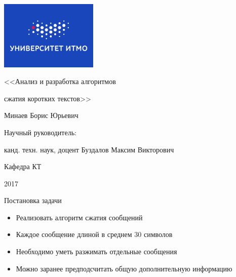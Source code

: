 \documentclass[t,13pt,graphics=pdflatex,xcolor=table,aspectratio=43]{beamer}
\begin{document}
\begingroup
{}
\begin{frame}[plain]
\color{white}
\centering\bfseries
\includegraphics[width=0.35\textwidth]{itmo_small_blue_rus.png}

{\Large {<<}Анализ и разработка алгоритмов \par
            сжатия коротких текстов{>>} \par}

\vspace{0pt plus 0.3filll}

{\large Минаев Борис Юрьевич}

\vspace{0pt plus 0.3filll}

{\small Научный руководитель:\par
 канд. техн. наук, доцент Буздалов Максим Викторович}

\vspace{0pt plus 0.3filll}

{\small Кафедра КТ\par 2017} 

\vspace{0pt plus 1filll}
\end{frame}
\endgroup




\begin{frame}{Постановка задачи}
\begin{itemize}
    \item Реализовать алгоритм сжатия сообщений
    \item Каждое сообщение длиной в среднем 30 символов
    \item Необходимо уметь разжимать отдельные сообщения
    \item Можно заранее предподсчитать общую дополнительную информацию
\end{itemize}
\end{frame}
\end{document}
